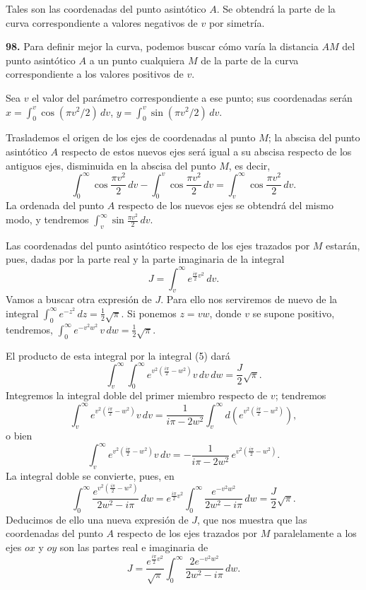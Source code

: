 Tales son las coordenadas del punto asintótico $A$. Se obtendrá la parte
de la curva correspondiente a valores negativos de $v$ por simetría.

\noindent\textbf{98.} Para definir mejor la curva, podemos buscar cómo
varía la distancia $AM$ del punto asintótico $A$ a un punto cualquiera $M$
de la parte de la curva correspondiente a los valores positivos de $v$.

Sea $v$ el valor del parámetro correspondiente a ese punto; sus
coordenadas serán $x=\int_0^v\cos(\pi v^2/2)\,dv$,
$y=\int_0^v\sin(\pi v^2/2)\,dv$.

Traslademos el origen de los ejes de coordenadas al punto $M$; la
abscisa del punto asintótico $A$ respecto de estos nuevos ejes será igual
a su abscisa respecto de los antiguos ejes, disminuida en la abscisa del
punto $M$, es decir,
\[
\int_0^\infty\cos\frac{\pi v^2}{2}\,dv - \int_0^v\cos\frac{\pi v^2}{2}\,dv
= \int_v^\infty \cos\frac{\pi v^2}{2}\,dv.
\]
La ordenada del punto $A$ respecto de los nuevos ejes se obtendrá del
mismo modo, y tendremos $\displaystyle\int_v^\infty\sin\frac{\pi v^2}{2}\,dv$.

Las coordenadas del punto asintótico respecto de los ejes trazados por
$M$ estarán, pues, dadas por la parte real y la parte imaginaria de la
integral
\begin{equation}
J = \int_v^\infty e^{\frac{i\pi}{2}v^2}\,dv.
\tag{5}
\end{equation}
Vamos a buscar otra expresión de $J$. Para ello nos serviremos de nuevo
de la integral $\displaystyle\int_0^\infty e^{-z^2}\,dz=\frac12\sqrt\pi$.
Si ponemos $z=vw$, donde $v$ se supone positivo, tendremos,
$\displaystyle\int_0^\infty e^{-v^2w^2}\,v\,dw=\frac12\sqrt\pi$.

El producto de esta integral por la integral (5) dará
\[
\int_v^\infty\!\int_0^\infty e^{v^2\left(\frac{i\pi}{2}-w^2\right)}
v\,dv\,dw = \frac{J}{2}\sqrt\pi.
\]
Integremos la integral doble del primer miembro respecto de $v$;
tendremos
\[
\int_v^\infty e^{v^2\left(\frac{i\pi}{2}-w^2\right)} v\,dv =
\frac{1}{i\pi-2w^2}\int_v^\infty
d\!\left(e^{v^2\left(\frac{i\pi}{2}-w^2\right)}\right),
\]
o bien
\[
\int_v^\infty e^{v^2\left(\frac{i\pi}{2}-w^2\right)} v\,dv =
-\frac{1}{i\pi-2w^2}\,e^{v^2\left(\frac{i\pi}{2}-w^2\right)}.
\]
La integral doble se convierte, pues, en
\[
\int_0^\infty \frac{e^{v^2\left(\frac{i\pi}{2}-w^2\right)}}{2w^2-i\pi}\,dw
= e^{\frac{i\pi}{2}v^2}\int_0^\infty \frac{e^{-v^2w^2}}{2w^2-i\pi}\,dw
= \frac{J}{2}\sqrt\pi.
\]
Deducimos de ello una nueva expresión de $J$, que nos muestra que las
coordenadas del punto $A$ respecto de los ejes trazados por $M$
paralelamente a los ejes $ox$ y $oy$ son las partes real e imaginaria de
\begin{equation}
J = \frac{e^{\frac{i\pi}{2}v^2}}{\sqrt\pi}
\int_0^\infty \frac{2e^{-v^2w^2}}{2w^2-i\pi}\,dw.
\tag{6}
\end{equation}


